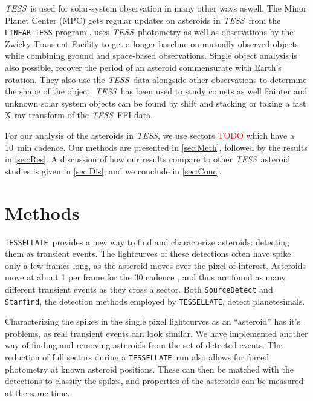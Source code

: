 \documentclass[12pt]{article}
\newcommand{\ttt}{\texttt}
\newcommand{\tess}{\textit{TESS}}
\newcommand{\tessellate}{\texttt{TESSELLATE}}
\newcommand{\red}[1]{\textcolor{red}{#1}}
\begin{document}
\tess\ is used for solar-system observation in many other ways aswell.
The Minor Planet Center (MPC) gets regular updates on asteroids in \tess\ from the \ttt{LINEAR-TESS} program \citep{Woods2021}.
\citet{Gowanlock2024} uses \tess\ photometry as well as observations by the Zwicky Transient Facility \citep[ZTF, ][]{Bellm2019} to get a longer baseline on mutually observed objects while combining ground and space-based observations.
Single object analysis is also possible, \citet{Humes2024} recover the period of an asteroid commensurate with Earth's rotation.
They also use the \tess\ data alongside other observations to determine the shape of the object.
\tess\ has been used to study comets as well \citep[e.g.][]{Ridden-Harper2021b}
Fainter and unknown solar system objects can be found by shift and stacking \citep{Holman2019, Payne2019, Rice2020} or taking a fast X-ray transform \citep{Nguyen2024} of the \tess\ FFI data.

For our analysis of the asteroids in \tess, we use sectors \red{TODO} %
which have a \qty{10}{\minute} cadence.
Our methods are presented in \autoref{sec:Meth}, followed by the results in \autoref{sec:Res}.
A discussion of how our results compare to other \tess\ asteroid studies is given in \autoref{sec:Dis}, and we conclude in \autoref{sec:Conc}.

\section{Methods}\label{sec:Meth}


\tessellate\ provides a new way to find and characterize asteroids: detecting them as transient events.
The lightcurves of these detections often have spike only a few frames long, as the asteroid moves over the pixel of interest.
Asteroids move at about \qty{1}{\px} per frame for the \qty{30}{\min} cadence \citep{Pal2018}, and thus are found as many different transient events as they cross a sector.
Both \ttt{SourceDetect} and \ttt{Starfind}, the detection methods employed by \tessellate, detect planetesimals.

Characterizing the spikes in the single pixel lightcurves as an ``asteroid'' has it's problems, as real transient events can look similar.
We have implemented another way of finding and removing asteroids from the set of detected events.
The reduction of full sectors during a \tessellate\ run also allows for forced photometry at known asteroid positions.
These can then be matched with the detections to classify the spikes, and properties of the asteroids can be measured at the same time.
\end{document}
